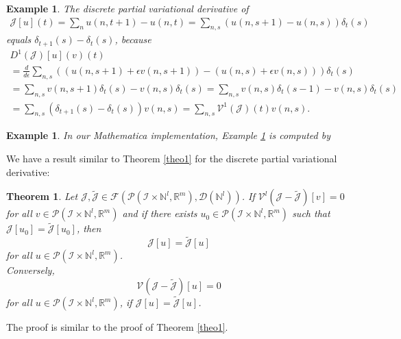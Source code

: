 \documentclass[sigconf,twocolumn]{acmart}
\newcommand{\Rr}{{\mathbb{R}}}
\newcommand{\Nn}{{\mathbb{N}}}
\newcommand{\1}{{\chi}}
\newcommand{\Ii}{{\mathcal{I}}}
\numberwithin{equation}{section}
\theoremstyle{thmlemcorr}
\numberwithin{theorem}{section}
\theoremstyle{thmlemcorr*}
\theoremstyle{defi}
\theoremstyle{remexample}
\newtheorem{example}[theorem]{Example}
\newtheorem{teo}[theorem]{Theorem}
\theoremstyle{ass}
\begin{document}
\begin{example}
	\label{dpvd1}
	The discrete partial variational derivative of 
	\begin{gather*}
		\mathcal{J}[u](t)=\sum_nu(n,t+1)-u(n,t)=\sum_{n,s}(u(n,s+1)-u(n,s))\delta_t(s)
	\end{gather*}
	equals $\delta_{t+1}(s)-\delta_t(s)$, because
	\small
	\begin{gather*}
		D^1(\mathcal{J})[u](v)(t)\\
		=\frac{d}{d\epsilon} \sum_{n,s}((u(n,s+1)+\epsilon v(n,s+1))-(u(n,s)+\epsilon v(n,s)))\delta_t(s)\\
		=\sum_{n,s}v(n,s+1)\delta_t(s)-v(n,s)\delta_t(s)=\sum_{n,s}v(n,s)\delta_t(s-1)-v(n,s)\delta_t(s)\\
		=\sum_{n,s}(\delta_{t+1}(s)-\delta_t(s))v(n,s)=\sum_{n,s}\mathcal{V}^1(\mathcal{J})(t)v(n,s).
	\end{gather*}
	\normalsize
\end{example}
\begin{example}
	In our {\sc Mathematica} implementation, Example \ref{dpvd1} is computed by
		
	\begin{small}
		
		
	\end{small}
\end{example}
We have a result similar to Theorem \ref{theo1} for the discrete partial variational derivative:
\begin{teo}\label{theo2}
	Let $\mathcal{J},\tilde{\mathcal{J}}\in \mathcal{F}(\mathcal{P}(\Ii\times\Nn^l,\Rr^m),\mathcal{D}(\Nn^l))$. If $\mathcal{V}^l(\mathcal{J}-\tilde{\mathcal{J}})[v]=0$ for all $v\in\mathcal{P}(\Ii\times\Nn^l,\Rr^m)$ and if there exists $u_0\in\mathcal{P}(\Ii\times\Nn^l,\Rr^m)$ such that $\mathcal{J}[u_0]=\tilde{\mathcal{J}}[u_0]$, then
	\begin{equation*}
		\mathcal{J}[u]=\tilde{\mathcal{J}}[u]
	\end{equation*}
	for all $u\in\mathcal{P}(\Ii\times\Nn^l,\Rr^m)$.\\
	Conversely,
	\begin{equation*}
		\mathcal{V}(\mathcal{J}-\tilde{\mathcal{J}})[u]=0
	\end{equation*}
	for all $u\in\mathcal{P}(\Ii\times\Nn^l,\Rr^m)$, if $\mathcal{J}[u]=\tilde{\mathcal{J}}[u]$.
\end{teo}
The proof is similar to the proof of Theorem \ref{theo1}.
\end{document}
